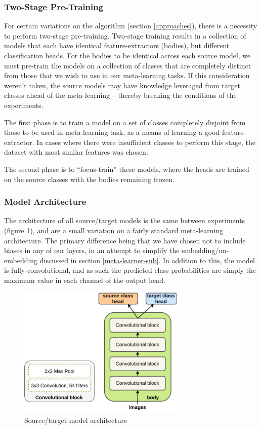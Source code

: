\documentclass{report}
\begin{document}
\subsubsection{Two-Stage Pre-Training}
For certain variations on the algorithm (section \ref{approaches}), there is a necessity to perform two-stage pre-training. Two-stage training results in a collection of models that each have identical feature-extractors (bodies), but different classification heads. For the bodies to be identical across each source model, we must pre-train the models on a collection of classes that are completely distinct from those that we wish to use in our meta-learning tasks. If this consideration weren't taken, the source models may have knowledge leveraged from target classes ahead of the meta-learning -- thereby breaking the conditions of the experiments. \par
The first phase is to train a model on a set of classes completely disjoint from those to be used in meta-learning task, as a means of learning a good feature-extractor. In cases where there were insufficient classes to perform this stage, the dataset with most similar features was chosen. \par
The second phase is to ``focus-train'' these models, where the heads are trained on the source classes with the bodies remaining frozen. \par


\subsubsection{Model Architecture}
The architecture of all source/target models is the same between experiments (figure \ref{fig:model-arch:1}), and are a small variation on a fairly standard meta-learning architecture. The primary difference being that we have chosen not to include biases in any of our layers, in an attempt to simplify the embedding/un-embedding discussed in section \ref{meta-learner-sub}. In addition to this, the model is fully-convolutional, and as such the predicted class probabilities are simply the maximum value in each channel of the output head.

\begin{figure}[h!]
	\centering
	\includegraphics[width=8cm]{model-arch}
	\caption{Source/target model architecture}
	\label{fig:model-arch:1}
\end{figure}
\end{document}
